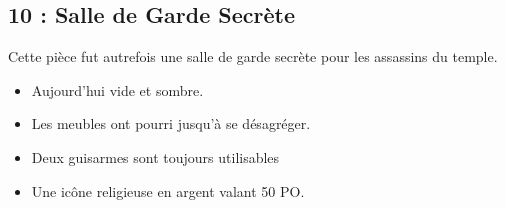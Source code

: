 \vfill\break
\subsection{10 : Salle de Garde Secrète}\label{n2:s10}
Cette pièce fut autrefois une salle de garde secrète pour
les assassins du temple. 

\begin{itemize}
  \item Aujourd'hui vide et sombre. 
  \item Les meubles ont pourri jusqu’à se désagréger. 
  \item Deux guisarmes sont toujours utilisables
  \item Une icône religieuse en argent valant 50 PO.
\end{itemize}